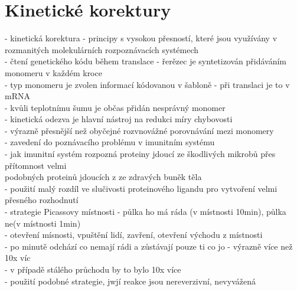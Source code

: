 \documentclass[11pt,a4paper]{report}
\begin{document}
\chapter{Kinetické korektury}
- kinetická korektura - principy s vysokou přesností, které jsou využívány v rozmanitých molekulárních rozpoznávacích systémech\\
- čtení genetického kódu během translace - řerězec je syntetizován přidáváním monomeru v každém kroce\\
\indent - typ monomeru je zvolen informací kódovanou v šabloně - při translaci je to v mRNA\\
\indent - kvůli teplotnímu šumu je občas přidán nesprávný monomer\\
\indent \indent - kinetická odezva je hlavní nástroj na redukci míry chybovosti\\ 
\indent \indent \indent - výrazně přesnější než obyčejné rozvnovážné porovnávání mezi monomery\\
- zavedení do poznávacího problému v imunitním systému\\
\indent - jak imunitní systém rozpozná proteiny jdoucí ze škodlivých mikrobů přes přítomnost velmi\\
\indent \indent podobných proteinů jdoucích z ze zdravých buněk těla\\
\indent - použití malý rozdíl ve slučivosti proteinového ligandu pro vytvoření velmi přesného rozhodnutí\\
- strategie Picassovy místnosti - půlka ho má ráda (v místnosti 10min), půlka ne(v místnosti 1min)\\
\indent - otevření mísnosti, vpuštění lidí, zavření, otevření východu z místnosti\\
\indent - po minutě odchází co nemají rádi a zůstávají pouze ti co jo - výrazně více než 10x víc\\
\indent \indent - v případě stálého průchodu by to bylo 10x více\\
\indent - použití podobné strategie, jwjí reakce jsou nereverzivní, nevyvážená\\
\end{document}
